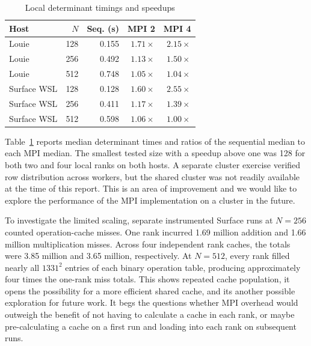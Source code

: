 \begin{table}[tb]
\caption{Local determinant timings and speedups}
\label{tab:mpi-local}
\centering
\begin{tabular}{lrrrr}
\hline
Host & $N$ & Seq. (s) & MPI 2 & MPI 4 \\
\hline
Louie & 128 & 0.155 & $1.71\times$ & $2.15\times$ \\
Louie & 256 & 0.492 & $1.13\times$ & $1.50\times$ \\
Louie & 512 & 0.748 & $1.05\times$ & $1.04\times$ \\
Surface WSL & 128 & 0.128 & $1.60\times$ & $2.55\times$ \\
Surface WSL & 256 & 0.411 & $1.17\times$ & $1.39\times$ \\
Surface WSL & 512 & 0.598 & $1.06\times$ & $1.00\times$ \\
\hline
\end{tabular}
\end{table}

Table~\ref{tab:mpi-local} reports median determinant times and ratios of
the sequential median to each MPI median. The smallest tested size with a
speedup above one was 128 for both two and four local ranks on both hosts.
A separate cluster exercise verified row distribution across workers, 
but the shared cluster was not readily available at the time of this report.
This is an area of improvement and we would like to explore the performance 
of the MPI implementation on a cluster in the future.

To investigate the limited scaling, separate instrumented Surface runs at
$N=256$ counted operation-cache misses. One rank incurred 1.69 million
addition and 1.66 million multiplication misses. Across four independent
rank caches, the totals were 3.85 million and 3.65 million, respectively.
At $N=512$, every rank filled nearly all $1331^2$ entries of each binary
operation table, producing approximately four times the one-rank miss totals.
This shows repeated cache population, it opens the possibility for a more efficient 
shared cache, and its another possible exploration for future work.
It begs the questions whether MPI overhead would outweigh the benefit of not having
to calculate a cache in each rank, or maybe pre-calculating a cache on a first run 
and loading into each rank on subsequent runs.